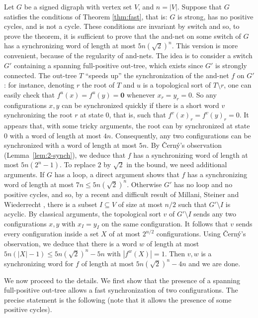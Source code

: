 \documentclass[11pt,letter]{article}
\newcommand{\ZERO}{{\mathbf{0}}}
\begin{document}
Let $G$ be a signed digraph with vertex set $V$, and $n=|V|$. Suppose that $G$ satisfies the conditions of Theorem \ref{thm:fast}, that is: $G$ is strong, has no positive cycles, and is not a cycle. These conditions are invariant by switch and so, to prove the theorem, it is sufficient to prove that the and-net on some switch of $G$ has a synchronizing word of length at most $5n(\sqrt{2})^n$. This version is more convenient, because of the regularity of and-nets. The idea is to consider a switch $G'$ containing a spanning full-positive out-tree, which exists since $G'$ is strongly connected. The out-tree $T$ ``speeds up'' the synchronization of the and-net $f$ on $G'$: for instance, denoting $r$ the root of $T$ and $u$ is a topological sort of $T\setminus r$, one can easily check that $f^u(x)=f^u(y)=\ZERO$ whenever $x_r=y_r=0$. So any configurations $x,y$ can be synchronized quickly if there is a short word $v$ synchronizing the root $r$ at state $0$, that is, such that $f^v(x)_r=f^v(y)_r=0$. It appears that, with some tricky arguments, the root can by synchronized at state $0$ with a word of length at most $4n$. Consequently, any two configurations can be synchronized with a word of length at most $5n$. By \v{C}ern\'y's observation (Lemma~\ref{lem:2-synch}), we deduce that $f$ has a synchronizing word of length at most $5n(2^n-1)$. To replace $2$ by $\sqrt{2}$ in the bound, we need additional arguments. If $G$ has a loop, a direct argument shows that $f$ has a synchronizing word of length at most $7n\leq 5n(\sqrt{2})^n$. Otherwise $G'$ has no loop and no positive cycles, and so, by a recent and difficult result of Millani, Steiner and Wiederrecht \cite{MSW19}, there is a subset $I\subseteq V$ of size at most $n/2$ such that $G'\setminus I$ is acyclic. By classical arguments, the topological sort $v$ of $G'\setminus I$ sends any two configurations $x,y$ with $x_I=y_I$ on the same configuration. It follows that $v$ sends every configuration inside a set $X$ of at most $2^{n/2}$ configurations. Using \v{C}ern\'y's observation, we deduce that there is a word $w$ of length at most $5n(|X|-1)\leq 5n(\sqrt{2})^n-5n$ with $|f^w(X)|=1$. Then $v,w$ is a synchronizing word for $f$ of length at most $5n(\sqrt{2})^n-4n$ and we are done. 

\medskip
We now proceed to the details. We first show that the presence of a spanning full-positive out-tree allows a fast synchronization of two configurations. The precise statement is the following (note that it allows the presence of some positive cycles). 
\end{document}
